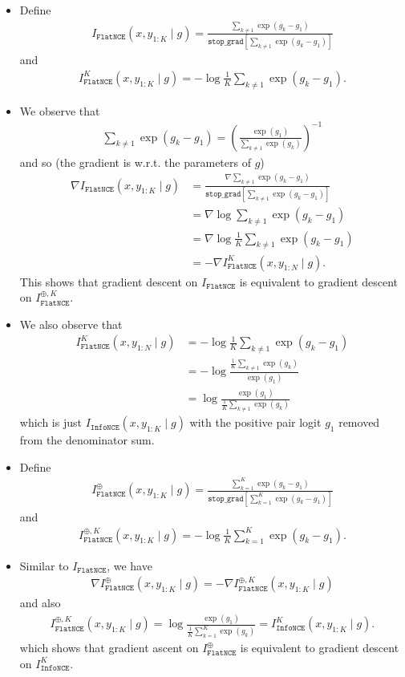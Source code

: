 \documentclass[10pt]{article}
\newcommand{\infonce}{\texttt{InfoNCE}}
\newcommand{\flatnce}{\texttt{FlatNCE}}
\newcommand{\stopg}{\texttt{stop\char`_grad}}
\begin{document}
\begin{itemize}
\item Define
\begin{align*}
I_\flatnce(x,y_{1:K} \mid g) = \frac{\sum_{k \neq 1} \exp(g_k - g_1)}{\stopg[\sum_{k \neq 1} \exp(g_k - g_1)]}
\end{align*}
and
\begin{align*}
I^K_\flatnce(x,y_{1:K} \mid g) = - \log \frac{1}{K} \sum_{k \neq 1} \exp(g_k - g_1).
\end{align*}
\item We observe that
\begin{align*}
\sum_{k \neq 1} \exp(g_k - g_1) = \left( \frac{\exp(g_1)}{\sum_{k \neq 1} \exp(g_k)} \right)^{-1}
\end{align*}
and so (the gradient is w.r.t. the parameters of $g$)
\begin{align*}
\nabla I_\flatnce(x,y_{1:K} \mid g) &= \frac{\nabla \sum_{k \neq 1} \exp(g_k - g_1)}{\stopg[\sum_{k \neq 1} \exp(g_k - g_1)]} \\
&= \nabla \log \sum_{k \neq 1} \exp(g_k - g_1) \\
&= \nabla \log \frac{1}{K} \sum_{k \neq 1} \exp(g_k - g_1) \\
&= - \nabla I^K_\flatnce(x,y_{1:N} \mid g).
\end{align*}
This shows that gradient descent on $I_\flatnce$ is equivalent to gradient descent on $I^{\oplus,K}_\flatnce$.
\item We also observe that
\begin{align*}
I^K_\flatnce(x,y_{1:N} \mid g) &= - \log \frac{1}{K} \sum_{k \neq 1} \exp(g_k - g_1) \\
&= - \log \frac{\frac{1}{K} \sum_{k \neq 1} \exp(g_k)}{\exp(g_1)} \\
&= \log \frac{\exp(g_1)}{\frac{1}{K} \sum_{k \neq 1} \exp(g_k)}
\end{align*}
which is just $I_\infonce(x,y_{1:K} \mid g)$ with the positive pair logit $g_1$ removed from the denominator sum.

\newpage

\item Define
\begin{align*}
I^\oplus_\flatnce(x,y_{1:K} \mid g) = \frac{\sum_{k = 1}^K \exp(g_k - g_1)}{\stopg[\sum_{k = 1}^K \exp(g_k - g_1)]}
\end{align*}
and
\begin{align*}
I^{\oplus,K}_\flatnce(x,y_{1:K} \mid g) = - \log \frac{1}{K} \sum_{k = 1}^K \exp(g_k - g_1).
\end{align*}
\item Similar to $I_\flatnce$, we have
\begin{align*}
\nabla I^\oplus_\flatnce(x,y_{1:K} \mid g) = - \nabla I^{\oplus,K}_\flatnce(x,y_{1:K} \mid g)
\end{align*}
and also
\begin{align*}
I^{\oplus,K}_\flatnce(x,y_{1:K} \mid g) = \log \frac{\exp(g_1)}{\frac{1}{K} \sum_{k = 1}^K \exp(g_k) } = I_\infonce^K(x,y_{1:K} \mid g).
\end{align*}
which shows that gradient ascent on $I^\oplus_\flatnce$ is equivalent to gradient descent on $I_\infonce^K$.
\end{itemize}
\end{document}
